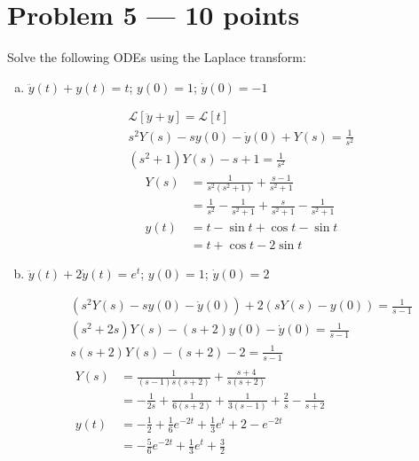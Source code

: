 \documentclass[12pt]{article}
\renewcommand{\L}{\mathcal{L}}
\begin{document}
\section*{Problem 5 --- 10 points}
    Solve the following ODEs using the Laplace transform:
    \begin{enumerate}[a.]
        \item $\ddot{y}(t) + y(t) = t$; \quad $y(0) = 1$; \quad $\dot{y}(0) = -1$
        
        \color{darkblue}
            \begin{gather*}
            \L[\ddot y + y] = \L[t] \\
            s^2 Y(s) - s y(0) - \dot y(0) + Y(s) = \frac{1}{s^2} \\
            (s^2 + 1) Y(s) - s + 1 = \frac{1}{s^2}
        \end{gather*}
        \begin{align*}
            Y(s) &= \frac{1}{s^2(s^2 + 1)} + \frac{s - 1}{s^2 + 1} \\
            &= \frac{1}{s^2} - \frac{1}{s^2 + 1} + \frac{s}{s^2 + 1} - \frac{1}{s^2 + 1}\\ 
            y(t) &= t - \sin t + \cos t - \sin t \\
            &= \boxed{t + \cos t - 2\sin t}
        \end{align*}
        \color{black}

        \item $\ddot{y}(t) + 2\dot{y}(t) = e^t$; \quad $y(0) = 1$; \quad $\dot{y}(0) = 2$
        
        \color{darkblue}
        
        \begin{gather*}
           ( s^2 Y(s) - sy(0) - \dot y(0)) + 2(sY(s) - y(0)) = \frac{1}{s-1} \\
            (s^2 + 2s) Y(s) - (s + 2)y(0) - \dot y(0) = \frac{1}{s-1} \\
            s(s + 2) Y(s) - (s + 2) - 2 = \frac{1}{s-1} \\
            \begin{aligned}
                Y(s) &= \frac{1}{(s-1)s(s+2)} + \frac{s + 4}{s(s+2)}\\ 
                &= -\frac{1}{2s} + \frac{1}{6(s + 2)} + \frac{1}{3(s - 1)} + \frac{2}{s} - \frac{1}{s + 2}\\ 
                y(t) &= -\frac{1}{2} + \frac{1}{6} e^{-2t} + \frac{1}{3} e^{t} + 2 - e^{-2t}\\
                &= \boxed{-\frac{5}{6}e^{-2t} + \frac{1}{3} e^{t} + \frac{3}{2}}
            \end{aligned}
        \end{gather*}
        \color{black}

    \end{enumerate}
\end{document}
